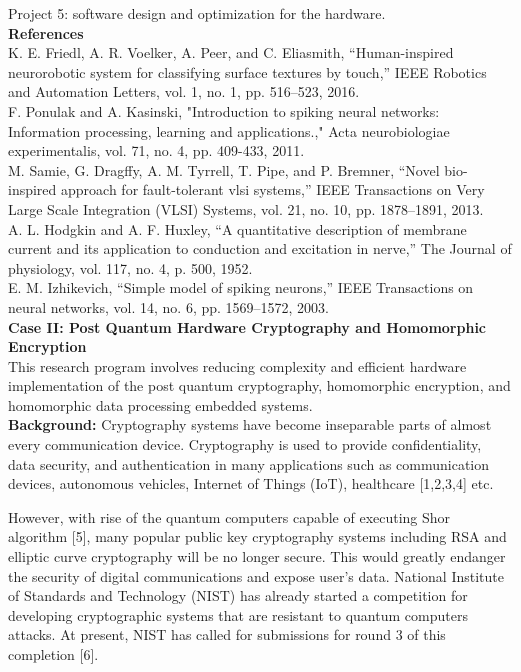 \documentclass[12pt,oneside]{book}
\begin{document}
{ Project 5:} software design and optimization for the hardware.
  \\
\hspace*{-1em}
{\bf References} \\
{\footnotesize
\phantom \quad [1] K. E. Friedl, A. R. Voelker, A. Peer, and C. Eliasmith, “Human-inspired neurorobotic system for classifying surface textures
by touch,” IEEE Robotics and Automation Letters, vol. 1, no. 1, pp. 516–523, 2016.\\[-0.1em]
\phantom \quad [2] F. Ponulak and A. Kasinski, "Introduction to spiking neural networks: Information processing, learning and applications.,"
Acta neurobiologiae experimentalis, vol. 71, no. 4, pp. 409-433, 2011.\\[-0.1em]
\phantom \quad [3] M. Samie, G. Dragffy, A. M. Tyrrell, T. Pipe, and P. Bremner, “Novel bio-inspired approach for fault-tolerant vlsi systems,”
IEEE Transactions on Very Large Scale Integration (VLSI) Systems, vol. 21, no. 10, pp. 1878–1891, 2013.\\[-0.1em]
\phantom \quad [4] A. L. Hodgkin and A. F. Huxley, “A quantitative description of membrane current and its application to conduction and
excitation in nerve,” The Journal of physiology, vol. 117, no. 4, p. 500, 1952.\\[-0.1em]
\phantom \quad [5] E. M. Izhikevich, “Simple model of spiking neurons,” IEEE Transactions on neural networks, vol. 14, no. 6, pp. 1569–1572,
2003.
}
 \thispagestyle{empty}
 \phantom \quad \\
{\bf Case II: 
Post Quantum Hardware Cryptography and Homomorphic  Encryption}\\
This research program involves reducing complexity and efficient hardware implementation of the post quantum cryptography, homomorphic encryption, and homomorphic data processing embedded systems. \\[0.2cm]
{\bf Background:  } 
Cryptography systems have become  inseparable parts of almost every communication device.
Cryptography is  used to provide confidentiality, data security, and authentication in many applications such as
communication devices, autonomous vehicles, Internet of Things (IoT), healthcare [1,2,3,4] etc.


However, with rise of the quantum computers capable of executing Shor algorithm  [5], many popular public key cryptography systems including RSA  and elliptic curve cryptography will be no longer secure.  This would greatly endanger the security of digital communications and expose user's data. 
 National Institute of Standards and Technology (NIST) has already started a competition for developing cryptographic systems that are resistant to quantum computers attacks. At present, NIST has called for submissions for round 3 of this completion [6]. 
\end{document}
